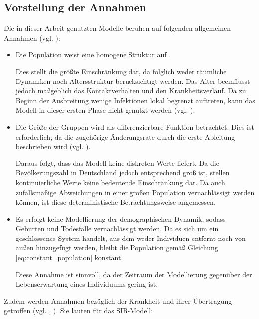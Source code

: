 \documentclass[../main.tex]{subfiles}
\begin{document}
    \subsection{Vorstellung der Annahmen}
    \label{ssec:assumptions1}
    Die in dieser Arbeit genutzten Modelle beruhen auf folgenden allgemeinen Annahmen (vgl. \cite[S. 8f]{Li18}):
    \begin{itemize}
      \item Die Population weist eine homogene Struktur auf .

      Dies stellt die größte Einschränkung dar, da folglich weder räumliche Dynamiken noch Altersstruktur berücksichtigt werden. Das Alter beeinflusst jedoch maßgeblich das Kontaktverhalten und den Krankheitsverlauf.
      Da zu Beginn der Ausbreitung wenige Infektionen lokal begrenzt auftreten, kann das Modell in dieser ersten Phase nicht genutzt werden (vgl. \cite[S. 25]{Bra08}).

      \item Die Größe der Gruppen wird als differenzierbare Funktion betrachtet. Dies ist erforderlich, da die zugehörige Änderungsrate durch die erste Ableitung beschrieben wird (vgl. \cite[S. 25]{Bra08}).
      
      Daraus folgt, dass das Modell keine diskreten Werte liefert. Da die Bevölkerungszahl in Deutschland jedoch entsprechend groß ist, stellen kontinuierliche Werte keine bedeutende Einschränkung dar.
      Da auch zufallsmäßige Abweichungen in einer großen Population vernachlässigt werden können, ist diese deterministische Betrachtungsweise angemessen.
      
      \item Es erfolgt keine Modellierung der demographischen Dynamik, sodass Geburten und Todesfälle vernachlässigt werden. Da es sich um ein geschlossenes System handelt, aus dem weder Individuen entfernt noch von außen hinzugefügt werden, bleibt die Population gemäß Gleichung \eqref{eq:constant_population} konstant.

      Diese Annahme ist sinnvoll, da der Zeitraum der Modellierung gegenüber der Lebenserwartung eines Individuums gering ist.
    \end{itemize}

    Zudem werden Annahmen bezüglich der Krankheit und ihrer Übertragung getroffen (vgl. \cite[S. 8f]{Li18}, \cite[S. 12]{Sul12}). Sie lauten für das SIR-Modell:
\end{document}
